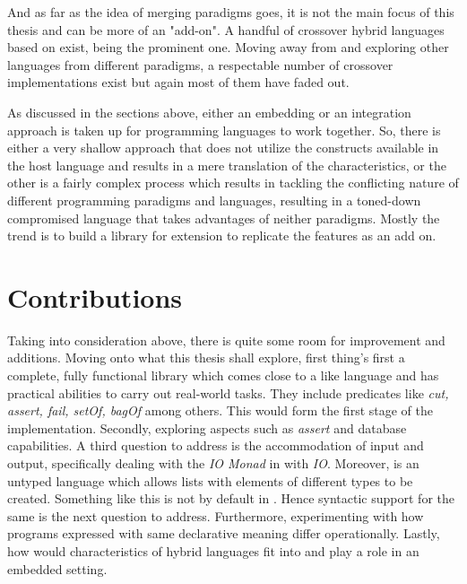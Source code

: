 \documentclass[thesis-solanki.tex]{subfiles}
\begin{document}
\par And as far as the idea of merging paradigms goes, it is not the main focus of this thesis and can be more of an "add-on". A handful of crossover hybrid 
languages based on  exist,  \cite{website:curry} being the prominent one. Moving away from  
and exploring other languages from different paradigms, a respectable number of crossover implementations exist but again most of them have faded out.   

\par As discussed in the sections above, either an embedding or an integration approach is taken up for programming languages to work together. 
So, there is either a very shallow approach that does not utilize the constructs available in the host language and results in a mere translation of the 
characteristics, or the other is a fairly complex process which results in tackling the conflicting nature of different programming paradigms and 
languages, resulting in a toned-down  compromised language that takes advantages of neither paradigms. Mostly the trend is to build a library for 
extension to replicate the features as an add on.       

\section{Contributions}

Taking into consideration above, there is quite some room for improvement and additions. Moving onto what this thesis shall explore, first 
thing's first a complete, fully functional library which comes close to a  like language and has practical abilities to 
carry out real-world tasks. They include predicates like \textit{cut, assert, fail, setOf, bagOf} among others. This would form the first 
stage of the implementation. Secondly, exploring aspects such as \textit{assert} and database capabilities. A third question to address is 
the accommodation of input and output, specifically dealing with the \textit{IO Monad} in  with  
\textit{IO}. Moreover,  is an untyped language which allows lists with elements of different types to be created. 
Something like this is not by default in . Hence syntactic support for the same is the next question to address. 
Furthermore, experimenting with how programs expressed with same declarative meaning differ operationally. Lastly, how would 
characteristics of hybrid languages fit into and play a role in an embedded setting.  
\end{document}
